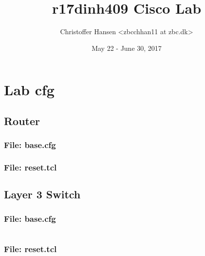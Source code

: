\documentclass{article}
\begin{document}
\title{r17dinh409 Cisco Lab}
\author{Christoffer Hansen <zbcchhan11 at zbc.dk>}
\date{May 22 - June 30, 2017}
\maketitle

\newpage
\tableofcontents


%
%
\section{Lab cfg}


\subsection{Router}
\subsubsection{File: base.cfg}
\subsubsection{File: reset.tcl}


\subsection{Layer 3 Switch}
\subsubsection{File: base.cfg}
\inputminted[frame=lines,framesep=2mm,baselinestretch=1.2,bgcolor=lightgray,fontsize=\footnotesize,linenos,breaklines=true]{tcl}{code/l3switch/base.cfg}
\subsubsection{File: reset.tcl}
\inputminted[frame=lines,framesep=2mm,baselinestretch=1.2,bgcolor=lightgray,fontsize=\footnotesize,linenos,breaklines=true]{tcl}{code/l3switch/reset-tcl.txt}
\end{document}

